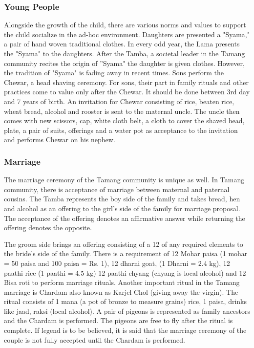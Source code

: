 \documentclass[a4paper,14pt]{article}
\begin{document}
\begin{flushleft}
\subsubsection{Young People}
Alongside the growth of the child, there are various norms and values to support the child socialize in the ad-hoc environment. Daughters are presented a "Syama," a pair of hand woven traditional clothes. In every odd year, the Lama presents the "Syama" to the daughters. After the Tamba, a societal leader in the Tamang community recites the origin of ”Syama" the daughter is given clothes. However, the tradition of "Syama" is fading away in recent times. Sons perform the Chewar, a head shaving ceremony. For sons, their part in family rituals and other practices come to value only after the Chewar. It should be done between 3rd day and 7 years of birth. An invitation for Chewar consisting of rice, beaten rice, wheat bread, alcohol and rooster is sent to the maternal uncle. The uncle then comes with new scissors, cap, white cloth belt, a cloth to cover the shaved head, plate, a pair of suits, offerings and a water pot as acceptance to the invitation and performs Chewar on his nephew. 

\subsubsection{Marriage} 
The marriage ceremony of the Tamang community is unique as well. In Tamang community, there is acceptance of marriage between maternal and paternal cousins. The Tamba represents the boy side of the family and takes bread, hen and alcohol as an offering to the girl's side of the family for marriage proposal. The acceptance of the offering denotes an affirmative answer while returning the offering denotes the opposite. 

The groom side brings an offering consisting of a 12 of any required elements to the bride's side of the family. There is a requirement of 12 Mohar paisa (1 mohar = 50 paisa and 100 paisa = Rs. 1), 12 dharni goat, (1 Dharni = 2.4 kg), 12 paathi rice (1 paathi = 4.5 kg) 12 paathi chyang (chyang is local alcohol) and 12 Bisa roti to perform marriage rituals. Another important ritual in the Tamang marriage is Chardam also known as Karjel Chol (giving away the virgin). The ritual consists of 1 mana (a pot of bronze to measure grains) rice, 1 paisa, drinks like jaad, raksi (local alcohol). A pair of pigeons is represented as family ancestors and the Chardam is performed. The pigeons are free to fly after the ritual is complete. If legend is to be believed, it is said that the marriage ceremony of the couple is not fully accepted until the Chardam is performed. 


\end{flushleft}
\end{document}
